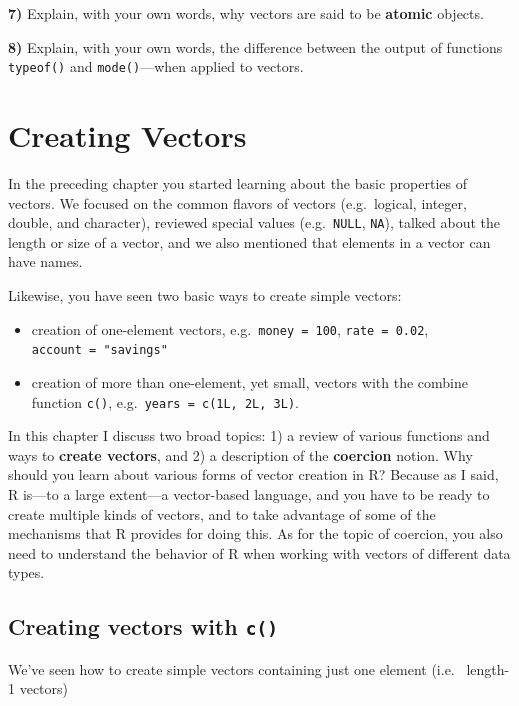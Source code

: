 \documentclass[
]{book}
\begin{document}
\textbf{7)} Explain, with your own words, why vectors are said to be \textbf{atomic} objects.

\textbf{8)} Explain, with your own words, the difference between the output of
functions \texttt{typeof()} and \texttt{mode()}---when applied to vectors.

\hypertarget{vectors3}{%
\chapter{Creating Vectors}\label{vectors3}}

In the preceding chapter you started learning about the basic properties of
vectors. We focused on the common flavors of vectors (e.g.~logical, integer,
double, and character), reviewed special values (e.g.~\texttt{NULL}, \texttt{NA}), talked
about the length or size of a vector, and we also mentioned that elements in a
vector can have names.

Likewise, you have seen two basic ways to create simple vectors:

\begin{itemize}
\item
  creation of one-element vectors, e.g.~\texttt{money\ =\ 100}, \texttt{rate\ =\ 0.02},
  \texttt{account\ =\ "savings"}
\item
  creation of more than one-element, yet small, vectors with the combine
  function \texttt{c()}, e.g.~\texttt{years\ =\ c(1L,\ 2L,\ 3L)}.
\end{itemize}

In this chapter I discuss two broad topics: 1) a review of various functions
and ways to \textbf{create vectors}, and 2) a description of the \textbf{coercion} notion.
Why should you learn about various forms of vector creation in R? Because as I
said, R is---to a large extent---a vector-based language, and you have to be
ready to create multiple kinds of vectors, and to take advantage of some of the
mechanisms that R provides for doing this. As for the topic of coercion, you
also need to understand the behavior of R when working with vectors of different
data types.

\hypertarget{creating-vectors-with-c}{%
\section{\texorpdfstring{Creating vectors with \texttt{c()}}{Creating vectors with c()}}\label{creating-vectors-with-c}}

We've seen how to create simple vectors containing just one element (i.e.~
length-1 vectors)
\end{document}

